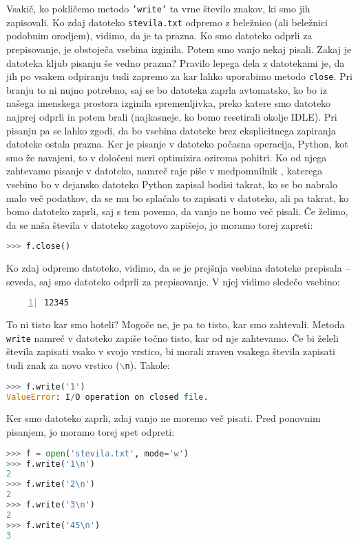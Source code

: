 Vsakič, ko pokličemo metodo \texttt{'write'} ta vrne število znakov, ki smo jih zapisovali. Ko zdaj datoteko \texttt{stevila.txt} odpremo z beležnico (ali beležnici podobnim orodjem), vidimo, da je ta prazna. Ko smo datoteko odprli za prepisovanje, je obstoječa vsebina izginila. Potem smo vanjo nekaj pisali. Zakaj je datoteka kljub pisanju še vedno prazna? Pravilo lepega dela z datotekami je, da jih po vsakem odpiranju tudi zapremo za kar lahko uporabimo metodo \texttt{close}. Pri branju to ni nujno potrebno, saj se bo datoteka zaprla avtomatsko, ko bo iz našega imenskega prostora izginila spremenljivka, preko katere smo datoteko najprej odprli in potem brali (najkasneje, ko bomo resetirali okolje IDLE). Pri pisanju pa se lahko zgodi, da bo vsebina datoteke brez eksplicitnega zapiranja datoteke ostala prazna. Ker je pisanje v datoteko počasna operacija, Python, kot smo že navajeni, to v določeni meri optimizira oziroma pohitri. Ko od njega zahtevamo pisanje v datoteko, namreč raje piše v medpomnilnik , katerega vsebino bo v dejansko datoteko Python zapisal bodisi takrat, ko se bo nabralo malo več podatkov, da se mu bo splačalo to zapisati v datoteko, ali pa takrat, ko bomo datoteko zaprli, saj s tem povemo, da vanjo ne bomo več pisali. Če želimo, da se naša števila v datoteko zagotovo zapišejo, jo moramo torej zapreti:
\begin{lstlisting}[language=Python, showstringspaces=false]
>>> f.close()
\end{lstlisting}
Ko zdaj odpremo datoteko, vidimo, da se je prejšnja vsebina datoteke prepisala -- seveda, saj smo datoteko odprli za prepisovanje. V njej vidimo sledečo vsebino:
\begin{lstlisting}[showstringspaces=false,numbers=left]
12345
\end{lstlisting}
To ni tisto kar smo hoteli? Mogoče ne, je pa to tisto, kar smo zahtevali. Metoda \texttt{write} namreč v datoteko zapiše točno tisto, kar od nje zahtevamo. Če bi želeli števila zapisati vsako v svojo vrstico, bi morali zraven vsakega števila zapisati tudi znak za novo vrstico (\texttt{$\backslash$n}). Takole:
\begin{lstlisting}[language=Python, showstringspaces=false]
>>> f.write('1')
ValueError: I/O operation on closed file.
\end{lstlisting}
Ker smo datoteko zaprli, zdaj vanjo ne moremo več pisati. Pred ponovnim pisanjem, jo moramo torej spet odpreti:
\begin{lstlisting}[language=Python, showstringspaces=false]
>>> f = open('stevila.txt', mode='w')
>>> f.write('1\n')
2
>>> f.write('2\n')
2
>>> f.write('3\n')
2
>>> f.write('45\n')
3
\end{lstlisting}
